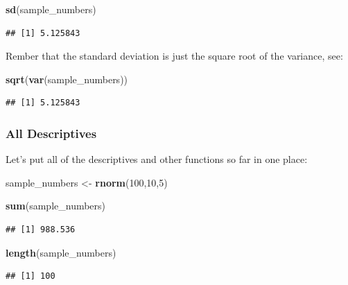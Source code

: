 \documentclass[]{book}
\newenvironment{Shaded}{\begin{snugshade}}{\end{snugshade}}
\newcommand{\KeywordTok}[1]{\textcolor[rgb]{0.13,0.29,0.53}{\textbf{{#1}}}}
\newcommand{\DecValTok}[1]{\textcolor[rgb]{0.00,0.00,0.81}{{#1}}}
\newcommand{\StringTok}[1]{\textcolor[rgb]{0.31,0.60,0.02}{{#1}}}
\newcommand{\NormalTok}[1]{{#1}}
\theoremstyle{definition}
\theoremstyle{definition}
\theoremstyle{definition}
\theoremstyle{remark}
\begin{document}
\begin{Shaded}
\begin{Highlighting}[]
\KeywordTok{sd}\NormalTok{(sample_numbers)}
\end{Highlighting}
\end{Shaded}

\begin{verbatim}
## [1] 5.125843
\end{verbatim}

Rember that the standard deviation is just the square root of the
variance, see:

\begin{Shaded}
\begin{Highlighting}[]
\KeywordTok{sqrt}\NormalTok{(}\KeywordTok{var}\NormalTok{(sample_numbers))}
\end{Highlighting}
\end{Shaded}

\begin{verbatim}
## [1] 5.125843
\end{verbatim}

\subsubsection{All Descriptives}\label{all-descriptives}

Let's put all of the descriptives and other functions so far in one
place:

\begin{Shaded}
\begin{Highlighting}[]
\NormalTok{sample_numbers <-}\StringTok{ }\KeywordTok{rnorm}\NormalTok{(}\DecValTok{100}\NormalTok{,}\DecValTok{10}\NormalTok{,}\DecValTok{5}\NormalTok{)}

\KeywordTok{sum}\NormalTok{(sample_numbers)}
\end{Highlighting}
\end{Shaded}

\begin{verbatim}
## [1] 988.536
\end{verbatim}

\begin{Shaded}
\begin{Highlighting}[]
\KeywordTok{length}\NormalTok{(sample_numbers)}
\end{Highlighting}
\end{Shaded}

\begin{verbatim}
## [1] 100
\end{verbatim}
\end{document}

